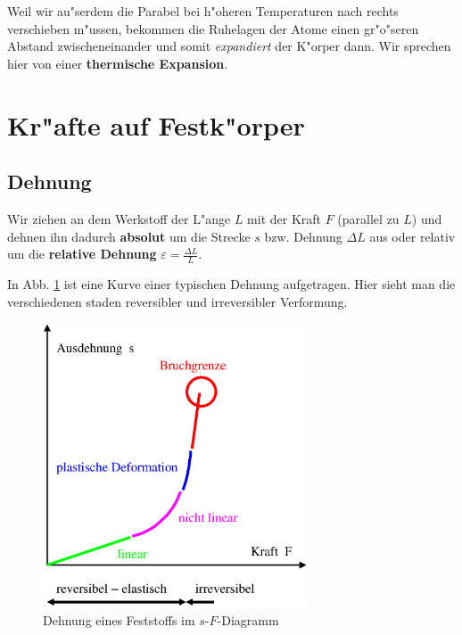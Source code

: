 Weil wir au"serdem die Parabel bei h"oheren Temperaturen nach rechts
verschieben m"ussen, bekommen die Ruhelagen der Atome einen gr"o"seren
Abstand zwischeneinander und somit \emph{expandiert} der K"orper
dann. Wir sprechen hier von einer \textbf{thermische Expansion}.



\section{Kr"afte auf Festk"orper}
\label{kap_krafte-auf-festkorper}


\subsection{Dehnung}
\label{kap_dehnung}

Wir ziehen an dem Werkstoff der L"ange $L$ mit der Kraft $F$ (parallel
zu $L$) und dehnen ihn dadurch \textbf{absolut} um die Strecke $s$
bzw. Dehnung $\Delta L$ aus oder relativ um die
\textbf{relative Dehnung} $\varepsilon =
\frac{\Delta L}{L}$. 


In Abb. \ref{abb_dehnung} ist eine Kurve einer typischen
Dehnung aufgetragen. Hier sieht man die verschiedenen staden
reversibler und irreversibler Verformung.

\begin{figure}
   \centering
   \includegraphics[width=0.7\textwidth]{bilder/dehnung}
   \caption{Dehnung eines Feststoffs im $s$-$F$-Diagramm}
   \label{abb_dehnung}
\end{figure}

